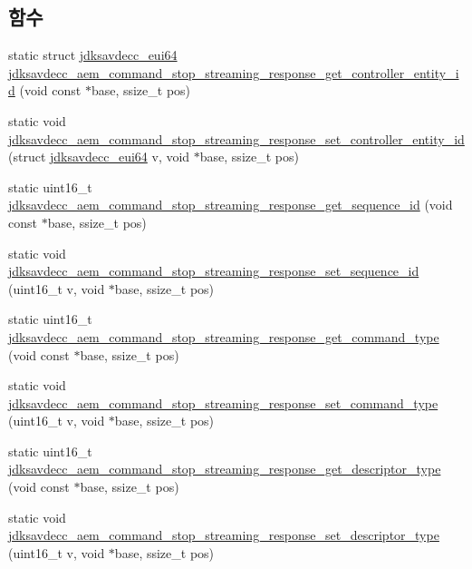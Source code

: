 \subsection*{함수}
\begin{DoxyCompactItemize}
\item 
static struct \hyperlink{structjdksavdecc__eui64}{jdksavdecc\+\_\+eui64} \hyperlink{group__command__stop__streaming__response_ga034c12a5cb127aa22e3b3d8e4e221e33}{jdksavdecc\+\_\+aem\+\_\+command\+\_\+stop\+\_\+streaming\+\_\+response\+\_\+get\+\_\+controller\+\_\+entity\+\_\+id} (void const $\ast$base, ssize\+\_\+t pos)
\item 
static void \hyperlink{group__command__stop__streaming__response_ga8955cc62885a3343e8a72fb7424ed034}{jdksavdecc\+\_\+aem\+\_\+command\+\_\+stop\+\_\+streaming\+\_\+response\+\_\+set\+\_\+controller\+\_\+entity\+\_\+id} (struct \hyperlink{structjdksavdecc__eui64}{jdksavdecc\+\_\+eui64} v, void $\ast$base, ssize\+\_\+t pos)
\item 
static uint16\+\_\+t \hyperlink{group__command__stop__streaming__response_gaf7c2461cb18a3f749552815cc76593e5}{jdksavdecc\+\_\+aem\+\_\+command\+\_\+stop\+\_\+streaming\+\_\+response\+\_\+get\+\_\+sequence\+\_\+id} (void const $\ast$base, ssize\+\_\+t pos)
\item 
static void \hyperlink{group__command__stop__streaming__response_ga1d8915b81b7e6a86375d46f41d3a62ac}{jdksavdecc\+\_\+aem\+\_\+command\+\_\+stop\+\_\+streaming\+\_\+response\+\_\+set\+\_\+sequence\+\_\+id} (uint16\+\_\+t v, void $\ast$base, ssize\+\_\+t pos)
\item 
static uint16\+\_\+t \hyperlink{group__command__stop__streaming__response_ga607ccee471fd78d4f2abd28274170150}{jdksavdecc\+\_\+aem\+\_\+command\+\_\+stop\+\_\+streaming\+\_\+response\+\_\+get\+\_\+command\+\_\+type} (void const $\ast$base, ssize\+\_\+t pos)
\item 
static void \hyperlink{group__command__stop__streaming__response_ga5d8733d893fc21d0f94d5cb048325f55}{jdksavdecc\+\_\+aem\+\_\+command\+\_\+stop\+\_\+streaming\+\_\+response\+\_\+set\+\_\+command\+\_\+type} (uint16\+\_\+t v, void $\ast$base, ssize\+\_\+t pos)
\item 
static uint16\+\_\+t \hyperlink{group__command__stop__streaming__response_ga34b89a4a83a1b2095386c25db82b29cd}{jdksavdecc\+\_\+aem\+\_\+command\+\_\+stop\+\_\+streaming\+\_\+response\+\_\+get\+\_\+descriptor\+\_\+type} (void const $\ast$base, ssize\+\_\+t pos)
\item 
static void \hyperlink{group__command__stop__streaming__response_ga3f9c0efc43409a43dd05676d8ac02229}{jdksavdecc\+\_\+aem\+\_\+command\+\_\+stop\+\_\+streaming\+\_\+response\+\_\+set\+\_\+descriptor\+\_\+type} (uint16\+\_\+t v, void $\ast$base, ssize\+\_\+t pos)

\end{DoxyCompactItemize}
